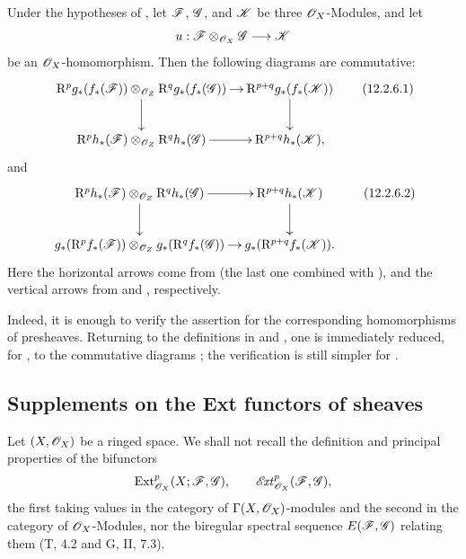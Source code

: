 \begin{env}[12.2.6]
\label{0.12.2.6}
Under the hypotheses of , let $\mathscr{F}$, $\mathscr{G}$,
and $\mathscr{K}$ be three $\mathscr{O}_X$-Modules, and let
\[
  u:\mathscr{F}\otimes_{\mathscr{O}_X}\mathscr{G}\longrightarrow\mathscr{K}
\]
be an $\mathscr{O}_X$-homomorphism.
Then the following diagrams are commutative:
\[
  \xymatrix@C=10pt@R=24pt{
    \RR^p g_*(f_*(\sh{F}))
      \otimes_{\sh{O}_Z}\RR^q g_*(f_*(\sh{G}))
      \ar[r]\ar[d]
      & \RR^{p+q}g_*(f_*(\sh{K}))\ar[d]\\
    \RR^p h_*(\sh{F})
      \otimes_{\sh{O}_Z}\RR^q h_*(\sh{G})
      \ar[r]
      & \RR^{p+q}h_*(\sh{K}),
  }
  \tag{12.2.6.1}
  \label{0.12.2.6.1}
\]
and
\[
  \xymatrix@C=10pt@R=24pt{
    \RR^p h_*(\sh{F})
      \otimes_{\sh{O}_Z}\RR^q h_*(\sh{G})
      \ar[r]\ar[d]
      & \RR^{p+q}h_*(\sh{K})\ar[d]\\
    g_*(\RR^p f_*(\sh{F}))
      \otimes_{\sh{O}_Z}g_*(\RR^q f_*(\sh{G}))
      \ar[r]
      & g_*(\RR^{p+q}f_*(\sh{K})).
  }
  \tag{12.2.6.2}
  \label{0.12.2.6.2}
\]
Here the horizontal arrows come from  (the last one
combined with ), and the vertical
arrows from  and , respectively.

Indeed, it is enough to verify the assertion for the corresponding
homomorphisms of presheaves.  Returning to the definitions in
 and , one is immediately reduced, for
, to the commutative diagrams
; the verification is still simpler for
.
\end{env}

\subsection{Supplements on the Ext functors of sheaves}
\label{subsection:0.12.3}

\begin{env}[12.3.1]
\label{0.12.3.1}
Let $(X,\mathscr{O}_X)$ be a ringed space.
We shall not recall the definition and principal properties of the
bifunctors
\[
  \operatorname{Ext}^p_{\mathscr{O}_X}(X;\mathscr{F},\mathscr{G}),
  \qquad
  \mathscr{E}\!\mathit{xt}^p_{\mathscr{O}_X}(\mathscr{F},\mathscr{G}),
\]
the first taking values in the category of
$\Gamma(X,\mathscr{O}_X)$-modules and the second in the category of
$\mathscr{O}_X$-Modules, nor the biregular spectral sequence
$E(\mathscr{F},\mathscr{G})$ relating them (T, 4.2 and G, II, 7.3).
\end{env}

